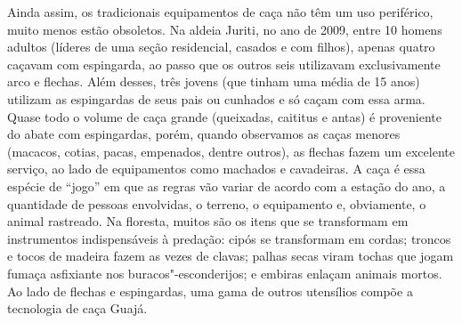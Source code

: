 Ainda assim, os tradicionais equipamentos de caça não têm um uso
periférico, muito menos estão obsoletos. Na aldeia Juriti, no ano de
2009, entre 10 homens adultos (líderes de uma seção residencial, casados
e com filhos), apenas quatro caçavam com espingarda, ao passo que os
outros seis utilizavam exclusivamente arco e flechas. Além desses, três
jovens (que tinham uma média de 15 anos) utilizam as espingardas de seus
pais ou cunhados e só caçam com essa arma. Quase todo o volume de caça
grande (queixadas, caititus e antas) é proveniente do abate com
espingardas, porém, quando observamos as caças menores (macacos, cotias,
pacas, empenados, dentre outros), as flechas fazem um excelente serviço,
ao lado de equipamentos como machados e cavadeiras. A caça é essa
espécie de ``jogo'' em que as regras vão variar de acordo com a estação do
ano, a quantidade de pessoas envolvidas, o terreno, o equipamento e,
obviamente, o animal rastreado. Na floresta, muitos são os itens que se
transformam em instrumentos indispensáveis à predação: cipós se
transformam em cordas; troncos e tocos de madeira fazem as vezes de
clavas; palhas secas viram tochas que jogam fumaça asfixiante nos
buracos"-esconderijos; e embiras enlaçam animais mortos. Ao lado de
flechas e espingardas, uma gama de outros utensílios compõe a tecnologia
de caça Guajá.


